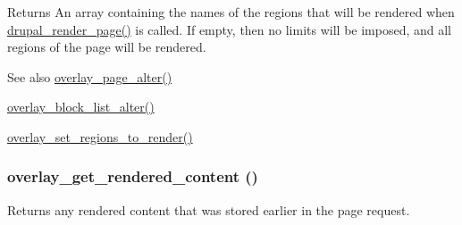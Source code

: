 \begin{DoxyReturn}{Returns}
An array containing the names of the regions that will be rendered when \hyperlink{common_8inc_ad85d021b660f070849ed7c215d9758fe}{drupal\_\-render\_\-page()} is called. If empty, then no limits will be imposed, and all regions of the page will be rendered.
\end{DoxyReturn}
\begin{DoxySeeAlso}{See also}
\hyperlink{overlay_8module_a6562f3cdc2016db35295e1c97a2de3f2}{overlay\_\-page\_\-alter()} 

\hyperlink{overlay_8module_a507bf99a50710b798ef39ff0e74b41a8}{overlay\_\-block\_\-list\_\-alter()} 

\hyperlink{overlay_8module_a85425da3ee5e291413da34bf6d966411}{overlay\_\-set\_\-regions\_\-to\_\-render()} 
\end{DoxySeeAlso}
\hypertarget{overlay_8module_a3dc272e9d1defe33078ae1c168acad24}{
\subsubsection[{overlay\_\-get\_\-rendered\_\-content}]{\setlength{\rightskip}{0pt plus 5cm}overlay\_\-get\_\-rendered\_\-content ()}}
\label{overlay_8module_a3dc272e9d1defe33078ae1c168acad24}
Returns any rendered content that was stored earlier in the page request.

